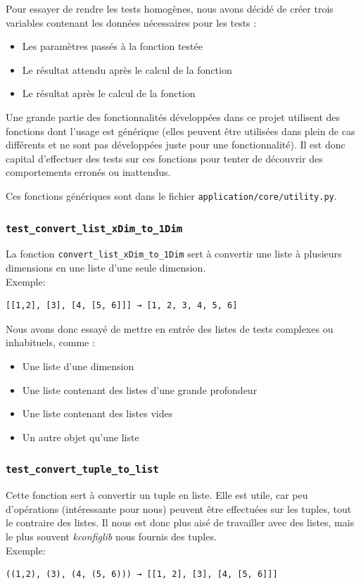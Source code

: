 ﻿\documentclass[17pts]{report}
\begin{document}
Pour essayer de rendre les tests homogènes, nous avons décidé de créer trois
variables contenant les données nécessaires pour les tests :
\begin{itemize}
    \item Les paramètres passés à la fonction testée
    \item Le résultat attendu après le calcul de la fonction
    \item Le résultat après le calcul de la fonction
\end{itemize}

Une grande partie des fonctionnalités développées dans ce projet utilisent des
fonctions dont l'usage est générique (elles peuvent être utilisées dans plein
de cas différents et ne sont pas développées juste pour une fonctionnalité). Il
est donc capital d'effectuer des tests sur ces fonctions pour tenter de
découvrir des comportements erronés ou inattendus.

Ces fonctions génériques sont dans le fichier
\verb|application/core/utility.py|.

\subsubsection{\texttt{test\_convert\_list\_xDim\_to\_1Dim}}
\label{ssub:ConvertListXDIMto1DIM}
La fonction \verb|convert_list_xDim_to_1Dim| sert à convertir une liste à
plusieurs dimensions en une liste d'une seule dimension.
\\
Exemple:
\begin{verbatim}
[[1,2], [3], [4, [5, 6]]] → [1, 2, 3, 4, 5, 6]
\end{verbatim}

Nous avons donc essayé de mettre en entrée des listes de tests complexes ou
inhabituels, comme :
\begin{itemize}
    \item Une liste d’une dimension
    \item Une liste contenant des listes d'une grande profondeur
    \item Une liste contenant des listes vides
    \item Un autre objet qu'une liste
\end{itemize}

\subsubsection{\texttt{test\_convert\_tuple\_to\_list}}
\label{ssub:ConvertTupleToList}
Cette fonction sert à convertir un tuple en liste. Elle est utile, car peu
d'opérations (intéressante pour nous) peuvent être effectuées sur les tuples,
tout le contraire des listes. Il nous est donc plus aisé de travailler avec des
listes, mais le plus souvent \textit{kconfiglib} nous fournis des tuples.
\\
Exemple:
\begin{verbatim}
((1,2), (3), (4, (5, 6))) → [[1, 2], [3], [4, [5, 6]]]
\end{verbatim}
\end{document}
